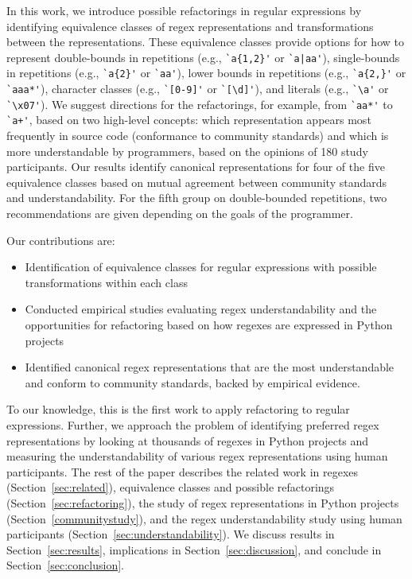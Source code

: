 In this work, we introduce possible refactorings in regular expressions by identifying equivalence classes of regex representations and transformations between the representations. 
These equivalence classes provide options for how to represent double-bounds in repetitions (e.g., \verb!`a{1,2}'! or \verb!`a|aa'!), single-bounds in repetitions (e.g., \verb!`a{2}'! or \verb!`aa'!), lower bounds in repetitions (e.g., \verb!`a{2,}'! or \verb!`aaa*'!), character classes (e.g., \verb!`[0-9]'! or \verb!`[\d]'!), and literals (e.g., \verb!`\a'! or \verb!`\x07'!). 
We suggest directions for the refactorings, for example, from \verb!`aa*'!  to  \verb!`a+'!, based on two high-level concepts: which representation appears most frequently in source code (conformance to community standards) and which is more understandable by programmers, based on the opinions of 180 study participants. 
Our results identify canonical representations for four of the five equivalence classes based on mutual agreement between community standards and understandability. For the fifth group on double-bounded repetitions, two recommendations are given depending on the goals of the programmer. 

Our contributions are:
\begin{itemize}
\item Identification of  equivalence classes for regular expressions with possible transformations within each class
\item Conducted empirical studies evaluating regex understandability and the opportunities for refactoring based on how regexes are expressed in Python projects
\item {Identified canonical regex representations that are the most understandable and conform to community standards, backed by empirical evidence.}
\end{itemize}

To our knowledge, this is the first work to apply refactoring to regular expressions. Further, we approach the problem of identifying preferred regex representations by looking at thousands of regexes in Python projects and measuring the understandability of various regex representations using human participants. The rest of the paper describes the related work in regexes (Section~\ref{sec:related}), equivalence classes and possible refactorings (Section~\ref{sec:refactoring}), the study of regex representations in Python projects (Section~\ref{communitystudy}), and the regex understandability study using human participants (Section~\ref{sec:understandability}). We discuss results in Section~\ref{sec:results}, implications in Section~\ref{sec:discussion}, and conclude in Section~\ref{sec:conclusion}. 

%
